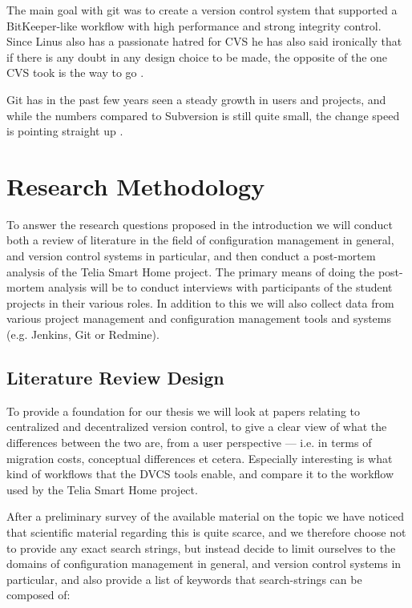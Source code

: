 \documentclass{llncs}
\begin{document}
The main goal with git was to create a version control system that
supported a BitKeeper-like workflow with high performance and strong
integrity control. Since Linus also has a passionate hatred for CVS he
has also said ironically that if there is any doubt in any design
choice to be made, the opposite of the one CVS took is the way to
go \cite{torvalds07}.

Git has in the past few years seen a steady growth in users and
projects, and while the numbers compared to Subversion is still quite
small, the change speed is pointing straight up \cite{bird09}.

\section{Research Methodology}
\label{sec:method}

To answer the research questions proposed in the introduction we will
conduct both a review of literature in the field of configuration
management in general, and version control systems in particular, and
then conduct a post-mortem analysis of the Telia Smart Home
project. The primary means of doing the post-mortem analysis will be
to conduct interviews with participants of the student projects in their
various roles. In addition to this we will also collect data from
various project management and configuration management tools and
systems (e.g. Jenkins, Git or Redmine).

\subsection{Literature Review Design}

To provide a foundation for our thesis we will look at papers relating
to centralized and decentralized version control, to give a clear view
of what the differences between the two are, from a user perspective
--- i.e. in terms of migration costs, conceptual differences et cetera.
Especially interesting is what kind of workflows that the DVCS tools
enable, and compare it to the workflow used by the Telia Smart Home
project.

After a preliminary survey of the available material on the topic we
have noticed that scientific material regarding this is quite scarce,
and we therefore choose not to provide any exact search strings, but
instead decide to limit ourselves to the domains of configuration
management in general, and version control systems in particular, and
also provide a list of keywords that search-strings can be composed
of: 
\end{document}
